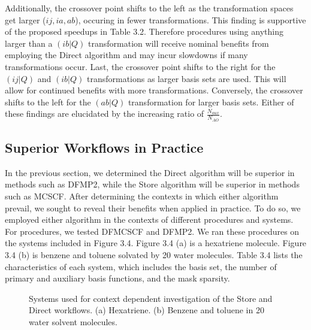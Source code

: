 Additionally, the crossover point shifts to the left as the transformation spaces get larger ($ij, ia, ab$), occuring in fewer transformations.
This finding is supportive of the proposed speedups in Table 3.2.
Therefore procedures using anything larger than a $(ib|Q)$ transformation will receive nominal benefits from employing the 
Direct algorithm and may incur slowdowns if many transformations occur.
Last, the crossover point shifts to the right for the $(ij|Q)$ and $(ib|Q)$ transformations as larger basis sets are used. 
This will allow for 
continued benefits with more transformations. Conversely, the crossover shifts to the left for the $(ab|Q)$ transformation
for larger basis sets. Either of these findings are elucidated
by the increasing ratio of $\frac{N_{aux}}{N_{AO}}$. 
 

\subsection{Superior Workflows in Practice}

In the previous section, we determined the Direct algorithm will be superior in methods such as DFMP2, while the Store 
algorithm will be superior in methods such as MCSCF.
After determining the contexts in which either algorithm prevail, we sought to reveal their benefits when applied in practice. 
To do so, we employed either algorithm
in the contexts of different procedures and systems. For procedures, we tested DFMCSCF and DFMP2. We ran these 
procedures on the systems included in Figure 3.4.
Figure 3.4 (a) is a hexatriene molecule. Figure 3.4 (b) is benzene and toluene solvated by 20 water molecules.
Table 3.4 lists the characteristics of each system,
which includes the basis set, the number of primary and auxiliary basis functions, and the mask sparsity. 


\begin{figure}[H]
  \captionsetup[subfigure]{}
  \centering
  \hfill
  \caption{Systems used for context dependent investigation of the Store and Direct workflows. (a) Hexatriene. (b) Benzene and toluene 
in 20 water solvent molecules. }
\end{figure}

